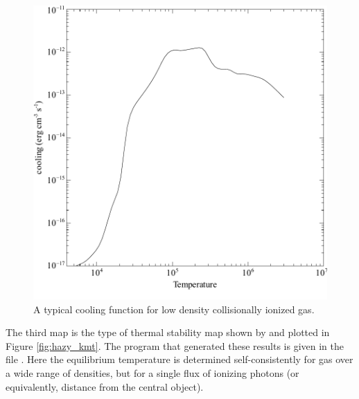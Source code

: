 \begin{figure}
\centering
\includegraphics[scale=0.8]{coolcurve}
\caption[Cooling function for collisionally ionized gas]{\label{fig:coolcurve}A typical cooling function for low
density collisionally ionized gas.}
\end{figure}

The third map is the type of thermal stability map shown by \citet{Krolik1981} and plotted in Figure \ref{fig:hazy_kmt}.
The program that generated these
results is given in the file .
Here the equilibrium temperature
is determined self-consistently for gas over a wide range of densities,
but for a single flux of ionizing photons (or equivalently, distance from
the central object).

